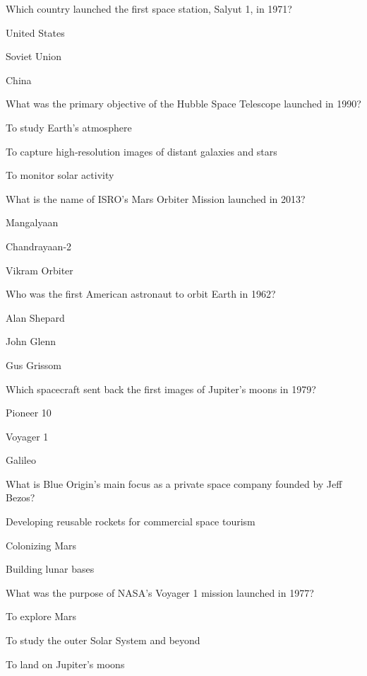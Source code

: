 \begin{enhancedmcq}{Which country launched the first space station, Salyut 1, in 1971?}
\item United States
\item Soviet Union
\item China

\end{enhancedmcq}
\begin{enhancedmcq}{What was the primary objective of the Hubble Space Telescope launched in 1990?}
\item To study Earth's atmosphere
\item To capture high‑resolution images of distant galaxies and stars
\item To monitor solar activity

\end{enhancedmcq}
\begin{enhancedmcq}{What is the name of ISRO's Mars Orbiter Mission launched in 2013?}
\item Mangalyaan
\item Chandrayaan‑2
\item Vikram Orbiter

\end{enhancedmcq}
\begin{enhancedmcq}{Who was the first American astronaut to orbit Earth in 1962?}
\item Alan Shepard
\item John Glenn
\item Gus Grissom

\end{enhancedmcq}
\begin{enhancedmcq}{Which spacecraft sent back the first images of Jupiter's moons in 1979?}
\item Pioneer 10
\item Voyager 1
\item Galileo

\end{enhancedmcq}
\begin{enhancedmcq}{What is Blue Origin's main focus as a private space company founded by Jeff Bezos?}
\item Developing reusable rockets for commercial space tourism
\item Colonizing Mars
\item Building lunar bases

\end{enhancedmcq}
\begin{enhancedmcq}{What was the purpose of NASA's Voyager 1 mission launched in 1977?}
\item To explore Mars
\item To study the outer Solar System and beyond
\item To land on Jupiter's moons

\end{enhancedmcq}

